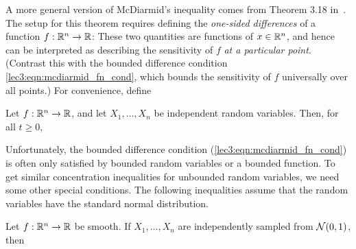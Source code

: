 A more general version of McDiarmid's inequality comes from Theorem 3.18 in~\cite{vanhandel2016high}. The setup for this theorem requires defining the \emph{one-sided differences} of a function $f : \mathbb R^n \to \mathbb R$:
These two quantities are functions of $x \in \mathbb R^n$, and hence can be interpreted as describing the sensitivity of $f$ \emph{at a particular point}. (Contrast this with the bounded difference condition \eqref{lec3:eqn:mcdiarmid_fn_cond}, which bounds the sensitivity of $f$ universally over all points.) For convenience, define
\begin{theorem}
    Let $f : \mathbb R^n \to \mathbb R$, and let $X_1, \ldots, X_n$ be independent random variables. Then, for all $t \geq 0$,
\end{theorem}

Unfortunately, the bounded difference condition (\ref{lec3:eqn:mcdiarmid_fn_cond}) is often only satisfied by bounded random variables or a bounded function. To get similar concentration inequalities for unbounded random variables, we need some other special conditions. The following inequalities assume that the random variables have the standard normal distribution.

\begin{theorem}
    Let $f : \mathbb R^n \to \mathbb R$ be smooth. If $X_1, \ldots, X_n$ are independently sampled from $\mathcal N(0, 1)$, then
\end{theorem}

